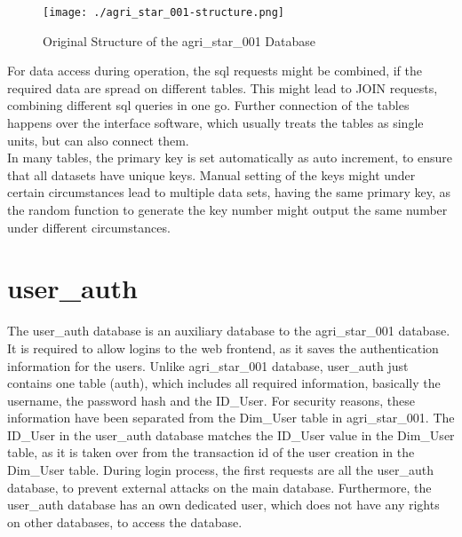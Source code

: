 \begin{figure}[h!]
 \centering
 \texttt{[image: ./agri\_star\_001-structure.png]}
 \caption{Original Structure of the agri\_star\_001 Database}
\end{figure}

\noindent For data access during operation, the sql requests might be combined, if the required data are spread on different tables. This might lead to JOIN requests, combining 
different sql queries in one go. Further connection of the tables happens over the interface software, which usually treats the tables as single units, but can also connect them.\\
In many tables, the primary key is set automatically as auto increment, to ensure that all datasets have unique keys. Manual setting of the keys might under certain circumstances 
lead to multiple data sets, having the same primary key, as the random function to generate the key number might output the same number under different circumstances.

\section{user\_auth}

The user\_auth database is an auxiliary database to the agri\_star\_001 database. It is required to allow logins to the web frontend, as it saves the authentication information 
for the users. Unlike agri\_star\_001 database, user\_auth just contains one table (auth), which includes all required information, basically the username, the password hash and the 
ID\_User. For security reasons, these information have been separated from the Dim\_User table in agri\_star\_001. The ID\_User in the user\_auth database matches the ID\_User 
value in the Dim\_User table, as it is taken over from the transaction id of the user creation in the Dim\_User table. During login process, the first requests are all the 
user\_auth database, to prevent external attacks on the main database. Furthermore, the user\_auth database has an own dedicated user, which does not have any rights on other 
databases, to access the database.

